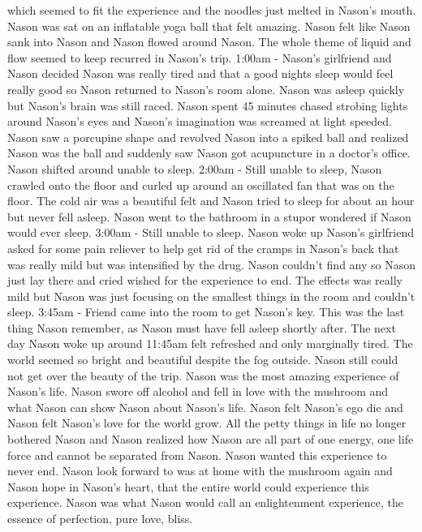 \documentclass[12pt]{book}
\begin{document}
which seemed to fit the experience and the noodles just melted in Nason's mouth. Nason was sat on an inflatable yoga ball that felt amazing. Nason felt like Nason sank into Nason and Nason flowed around Nason. The whole theme of liquid and flow seemed to keep recurred in Nason's trip. 1:00am - Nason's girlfriend and Nason decided Nason was really tired and that a good nights sleep would feel really good so Nason returned to Nason's room alone. Nason was asleep quickly but Nason's brain was still raced. Nason spent 45 minutes chased strobing lights around Nason's eyes and Nason's imagination was screamed at light speeded. Nason saw a porcupine shape and revolved Nason into a spiked ball and realized Nason was the ball and suddenly saw Nason got acupuncture in a doctor's office. Nason shifted around unable to sleep. 2:00am - Still unable to sleep, Nason crawled onto the floor and curled up around an oscillated fan that was on the floor. The cold air was a beautiful felt and Nason tried to sleep for about an hour but never fell asleep. Nason went to the bathroom in a stupor wondered if Nason would ever sleep. 3:00am - Still unable to sleep. Nason woke up Nason's girlfriend asked for some pain reliever to help get rid of the cramps in Nason's back that was really mild but was intensified by the drug. Nason couldn't find any so Nason just lay there and cried wished for the experience to end. The effects was really mild but Nason was just focusing on the smallest things in the room and couldn't sleep. 3:45am - Friend came into the room to get Nason's key. This was the last thing Nason remember, as Nason must have fell asleep shortly after. The next day Nason woke up around 11:45am felt refreshed and only marginally tired. The world seemed so bright and beautiful despite the fog outside. Nason still could not get over the beauty of the trip. Nason was the most amazing experience of Nason's life. Nason swore off alcohol and fell in love with the mushroom and what Nason can show Nason about Nason's life. Nason felt Nason's ego die and Nason felt Nason's love for the world grow. All the petty things in life no longer bothered Nason and Nason realized how Nason are all part of one energy, one life force and cannot be separated from Nason. Nason wanted this experience to never end. Nason look forward to was at home with the mushroom again and Nason hope in Nason's heart, that the entire world could experience this experience. Nason was what Nason would call an enlightenment experience, the essence of perfection, pure love, bliss.
\end{document}

